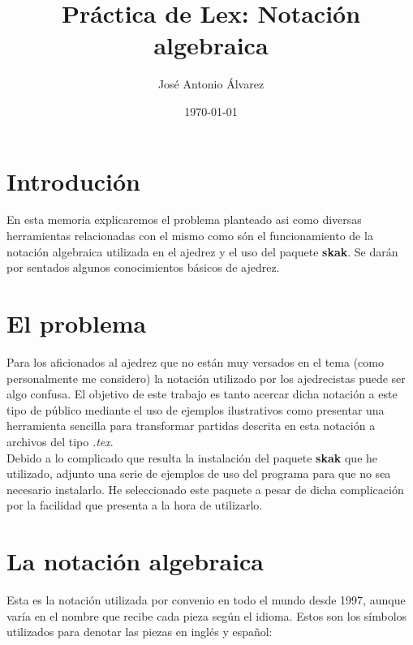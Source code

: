 \documentclass{article}
\title{Práctica de Lex: Notación algebraica}
\author{José Antonio Álvarez}
\date{\today}
\begin{document}
\maketitle

\section{Introdución}

En esta memoria explicaremos el problema planteado asi como diversas herramientas relacionadas con el mismo como són el funcionamiento de la notación algebraica utilizada en el ajedrez y el uso del paquete \textbf{skak}. Se darán por sentados algunos conocimientos básicos de ajedrez.

\section{El problema}

Para los aficionados al ajedrez que no están muy versados en el tema (como personalmente me considero) la notación utilizado por los ajedrecistas puede ser algo confusa. El objetivo de este trabajo es tanto acercar dicha notación a este tipo de público mediante el uso de ejemplos ilustrativos como presentar una herramienta sencilla para transformar partidas descrita en esta notación a archivos del tipo \emph{.tex}. \\

Debido a lo complicado que resulta la instalación del paquete \textbf{skak} que he utilizado, adjunto una serie de ejemplos de uso del programa para que no sea necesario instalarlo. He seleccionado este paquete a pesar de dicha complicación por la facilidad que presenta a la hora de utilizarlo.

\section{La notación algebraica}

Esta es la notación utilizada por convenio en todo el mundo desde 1997, aunque varía en el nombre que recibe cada pieza según el idioma. Estos son los símbolos utilizados para denotar las piezas en inglés y español:
\end{document}
